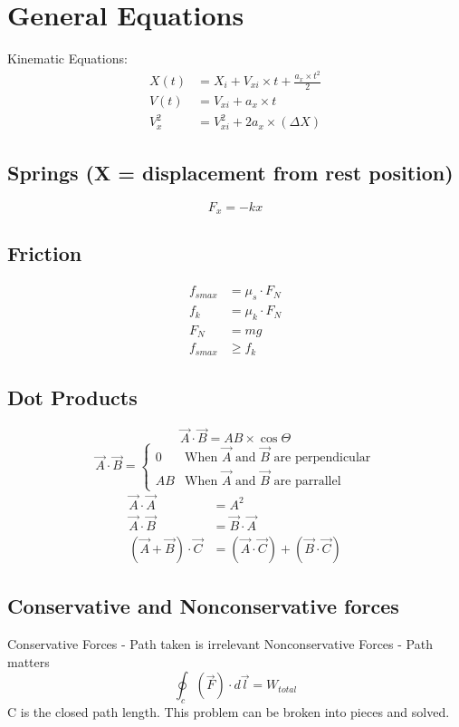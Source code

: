 \documentclass[8pt, twocolumn]{article}
\begin{document}
\section{General Equations}
	Kinematic Equations:
	\[
		\begin{aligned}
		X(t) &= X_i + V_{xi} \times t + \frac{a_x \times t ^ 2}{2} \\
		V(t) &= V_{xi} + a_x \times t \\
		V_x^2 &= V_{xi}^2 + 2a_x \times (\Delta X)
		\end{aligned}		
	\]

\subsection{Springs (X = displacement from rest position)}
	\[		
		F_x = -kx
	\]
\subsection{Friction}
	\[
		\begin{aligned}
		f_{smax} &= \mu_s \cdot F_N \\
		f_k &= \mu_k \cdot F_N \\
		F_N &= mg \\
		f_{smax} &\geq f_k 
		\end{aligned}		
	\]

\subsection{Dot Products}
	\[
		\vec{A} \cdot \vec{B} = AB \times \cos{\Theta}
	\]
	\[
		\vec{A} \cdot \vec{B} = \begin{cases}
						0 & \text{When } \vec{A} \text{ and } \vec{B} \text{ are perpendicular} \\
						AB & \text{When } \vec{A} \text{ and } \vec{B} \text{ are parrallel}
					 \end{cases}
	\]
	\[
	\begin{aligned}
		\vec{A} \cdot \vec{A} &= A^2 \\
		\vec{A} \cdot \vec{B} &= \vec{B} \cdot \vec{A} \\
		(\vec{A} + \vec{B}) \cdot \vec{C} &= (\vec{A} \cdot \vec{C}) + (\vec{B} \cdot \vec{C})
	\end{aligned}
	\]

\subsection{Conservative and Nonconservative forces}
	Conservative Forces - Path taken is irrelevant \newline
	Nonconservative Forces - Path matters
	\[\oint_c (\vec{F}) \cdot d\vec{l} = W_{total}\]
	C is the closed path length.  This problem can be broken into pieces and solved.
\end{document}
